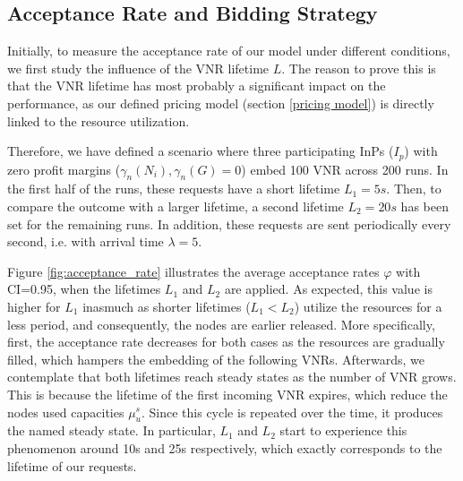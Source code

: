 \subsection{Acceptance Rate and Bidding Strategy}

Initially, to measure the acceptance rate of our model under different conditions, we first study the influence of the VNR lifetime $L$. The reason to prove this is that the VNR lifetime has most probably a significant impact on the performance, as our defined pricing model (section \ref{pricing model}) is directly linked to the resource utilization.

Therefore, we have defined a scenario where three participating InPs ($I_p$) with zero profit margins ($\gamma_n(N_i),\gamma_n(G) = 0$) embed 100 VNR across 200 runs. In the first half of the runs, these requests have a short lifetime $L_1 = 5s$. Then, to compare the outcome with a larger lifetime, a second lifetime $L_2=20s$ has been set for the remaining runs. In addition, these requests are sent periodically every second, i.e. with arrival time $\lambda = 5$.

Figure \ref{fig:acceptance_rate} illustrates the average acceptance rates $\varphi$ with CI=0.95, when the lifetimes $L_1$ and $L_2$ are applied. As expected, this value is higher for $L_1$ inasmuch as shorter lifetimes ($L_1 < L_2$) utilize the resources for a less period, and consequently, the nodes are earlier released. More specifically, first, the acceptance rate decreases for both cases as the resources are gradually filled, which hampers the embedding of the following VNRs. Afterwards, we contemplate that both lifetimes reach steady states as the number of VNR grows. This is because the lifetime of the first incoming VNR expires, which reduce the nodes used capacities $\mu^s_u$. Since this cycle is repeated over the time, it produces the named steady state. In particular, $L_1$ and $L_2$ start to experience this phenomenon around 10s and 25s respectively, which exactly corresponds to the lifetime of our requests.

